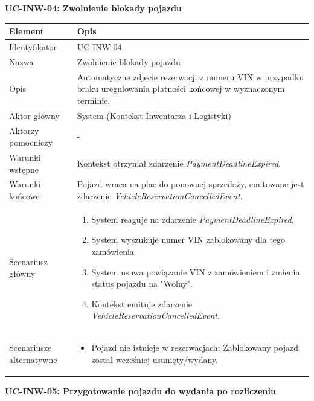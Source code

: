 \textbf{UC-INW-04: Zwolnienie blokady pojazdu}

\begin{longtable}{|p{4cm}|p{11cm}|}
\hline
\textbf{Element} & \textbf{Opis} \\
\hline

Identyfikator & UC-INW-04 \\
\hline

Nazwa & Zwolnienie blokady pojazdu \\
\hline

Opis & 
Automatyczne zdjęcie rezerwacji z numeru VIN w przypadku braku uregulowania płatności końcowej w wyznaczonym terminie. \\
\hline

Aktor główny & System (Kontekst Inwentarza i Logistyki) \\
\hline

Aktorzy pomocniczy & - \\
\hline

Warunki wstępne & 
Kontekst otrzymał zdarzenie \textit{PaymentDeadlineExpired}. \\
\hline

Warunki końcowe & 
Pojazd wraca na plac do ponownej sprzedaży, emitowane jest zdarzenie \textit{VehicleReservationCancelledEvent}. \\
\hline

Scenariusz główny & 
\begin{enumerate}
    \item System reaguje na zdarzenie \textit{PaymentDeadlineExpired}.
    \item System wyszukuje numer VIN zablokowany dla tego zamówienia.
    \item System usuwa powiązanie VIN z zamówieniem i zmienia status pojazdu na "Wolny".
    \item Kontekst emituje zdarzenie \textit{VehicleReservationCancelledEvent}.
\end{enumerate} \\
\hline

Scenariusze alternatywne & 
\begin{itemize}
    \item [A1] Pojazd nie istnieje w rezerwacjach: Zablokowany pojazd został wcześniej usunięty/wydany.
\end{itemize} \\
\hline
\end{longtable}

\textbf{UC-INW-05: Przygotowanie pojazdu do wydania po rozliczeniu}

